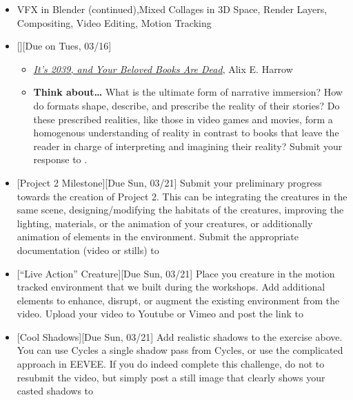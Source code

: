 \def\dMon{Mon, 03/15}
\def\dTues{Tues, 03/16}
\def\dWed{Wed, 03/17}
\def\dThur{Thur, 03/18}
\def\dFri{Fri, 03/19}
\def\dSat{Sat, 03/20}
\def\dSun{Sun, 03/21}
\placeDate

\begin{itemize}[noitemsep,topsep=0pt,leftmargin=*]
    \item {} VFX in Blender (continued),Mixed Collages in 3D Space, Render Layers, Compositing, Video Editing, Motion Tracking
    \item {}[][Due on \dTues]
          \begin{itemize}
              \item \href{https://www.nytimes.com/2019/12/02/opinion/future-virtual-reality-stories.html}{\emph{It’s 2039, and Your Beloved Books Are Dead}}, Alix E. Harrow
              \item \textbf{Think about\dots} What is the ultimate form of narrative immersion? How do formats shape, describe, and prescribe the reality of their stories? Do these prescribed realities, like those in video games and movies, form a homogenous understanding of reality in contrast to books that leave the reader in charge of interpreting and imagining their reality? Submit your response to \discordR.
          \end{itemize}
    \item {}[Project 2 Milestone][Due \dSun] Submit your preliminary progress towards the creation of Project 2. This can be integrating the creatures in the same scene, designing/modifying the habitats of the creatures, improving the lighting, materials, or the animation of your creatures, or additionally animation of elements in the environment. Submit the appropriate documentation (video or stills) to \discordE
    \item {}[``Live Action'' Creature][Due \dSun] Place you creature in the motion tracked environment that we built during the workshops. Add additional elements to enhance, disrupt, or augment the existing environment from the video. Upload your video to Youtube or Vimeo and post the link to \discordE
    \item {}[Cool Shadows][Due \dSun] Add realistic shadows to the exercise above. You can use Cycles a single shadow pass from Cycles, or use the complicated approach in EEVEE. If you do indeed complete this challenge, do not to resubmit the video, but simply post a still image that clearly shows your casted shadows to \discordC

\end{itemize}
